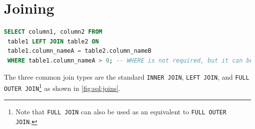 \section{Joining}
\label{sql:join}

\begin{lstlisting}[language=SQL]
SELECT column1, column2 FROM
 table1 LEFT JOIN table2 ON
 table1.column_nameA = table2.column_nameB
 WHERE table1.column_nameA > 0; -- WHERE is not required, but it can be included here
\end{lstlisting}

The three common join types are the standard
\texttt{INNER JOIN}, \texttt{LEFT JOIN},
and \texttt{FULL OUTER JOIN}\footnote{Note that \texttt{FULL JOIN} can also be used as an equivalent to \texttt{FULL OUTER JOIN}.} as
shown in \cref{fig:sql:joins}.


